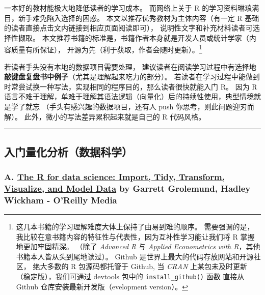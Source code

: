 \documentclass[11pt,hyperref]{ctexart}
\begin{document}
一本好的教材能极大地降低读者的学习成本。 而网络上关于 R
的学习资料琳琅满目，新手难免陷入选择的困惑。
本文以推荐优秀教材为主体内容（有一定 R
基础的读者直接点击文内链接到相应页面阅读即可），
说明性文字和补充材料读者可选择性撷取。
本文推荐书籍的标准是，书籍作者本身就是开发人员或统计学家（内容质量有所保证），
开源为先（利于获取，作者会随时更新）。\footnote{这几本书籍的学习理解难度大体上保持了由易到难的顺序。
  需要强调的是，我比较在意书籍内容的特征性与代表性，因为互补性学习能让我们将
  R 掌握地更加牢固精深。 （除了 \emph{Advanced R} 与 \emph{Applied
  Econometrics with R}，其他书籍本人皆从头到尾地读过）。 Github
  是世界上最大的代码存放网站和开源社区， 绝大多数的 R 包源码都托管于
  Github, 当 \emph{CRAN} 上某包未及时更新（稳定版），我们可通过 devtools
  包中的 \texttt{install\_github()} 函数 直接从 Github
  仓库安装最新开发版（evelopment version）。}

若读者手头没有本地的数据项目需要处理，
建议读者在阅读学习过程中\sout{有选择地}\textbf{敲键盘复盘书中例子}（尤其是理解起来吃力的部分）。
若读者在学习过程中能做到时常尝试换一种写法，实现相同的程序目的，那么读者很快就能入门
R。 因为 R
语言不难于理解，单难于理解其语法逻辑（向量化）后的持续性使用，典型情境就是学了就忘
（手头有感兴趣的数据项目，还有人 push 你思考，则此问题迎刃而解）。
此外，微小的写法差异累积起来就是自己的 R 代码风格。

\begin{center}\rule{0.5\linewidth}{0.5pt}\end{center}

\hypertarget{ux5165ux95e8ux91cfux5316ux5206ux6790ux6570ux636eux79d1ux5b66}{%
\subsection{入门量化分析（数据科学）}\label{ux5165ux95e8ux91cfux5316ux5206ux6790ux6570ux636eux79d1ux5b66}}

\hypertarget{a.-the-r-for-data-science-import-tidy-transform-visualize-and-model-data-by-garrett-grolemund-hadley-wickham---oreilly-media}{%
\subsubsection{\texorpdfstring{A. \href{https://r4ds.had.co.nz/}{The R
for data science: Import, Tidy, Transform, Visualize, and Model Data} by
Garrett Grolemund, Hadley Wickham - O'Reilly
Media}{A. The R for data science: Import, Tidy, Transform, Visualize, and Model Data by Garrett Grolemund, Hadley Wickham - O'Reilly Media}}\label{a.-the-r-for-data-science-import-tidy-transform-visualize-and-model-data-by-garrett-grolemund-hadley-wickham---oreilly-media}}
\end{document}
